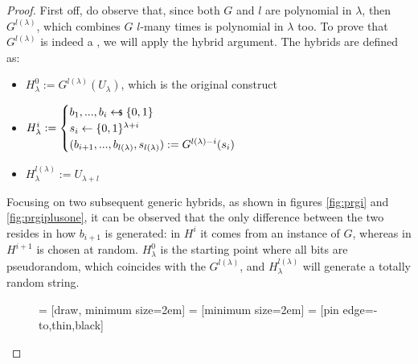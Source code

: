 \begin{proof}

    First off, do observe that, since both $G$ and $l$ are polynomial in $\lambda$, then $G^{l(\lambda)}$, which combines $G$ $l$-many times is polynomial in $\lambda$ too. To prove that $G^{l(\lambda)}$ is indeed a \prg, we will apply the hybrid argument. The hybrids are defined as:
    \begin{itemize}
        \item $H_{\lambda}^{0} := G^{l(\lambda)}(U_{\lambda})$, which is the original construct
        \item $H_{\lambda}^{i} :=
            \begin{cases}
                b_1 , ..., b_{i} \pickUAR \{0,1\} \\
                s_{i} \leftarrow \{0,1\}^{\lambda+i} \\
                (b_{i+1}, ..., b_{l(\lambda)}, s_{l(\lambda)}) := G^{l(\lambda)-i}(s_{i})
            \end{cases}$
        \item $H_{\lambda}^{l(\lambda)} := U_{\lambda + l}$
    \end{itemize}

    Focusing on two subsequent generic hybrids, as shown in figures \ref{fig:prgi} and \ref{fig:prgiplusone}, it can be observed that the only difference between the two resides in how $b_{i+1}$ is generated: in $H^{i}$ it comes from an instance of $G$, whereas in $H^{i+1}$ is chosen at random. $H_{\lambda}^{0}$ is the starting point where all bits are pseudorandom, which coincides with the $G^{l(\lambda)}$, and $H_{\lambda}^{l(\lambda)}$ will generate a totally random string.

    \begin{figure}[h]

           = [draw, minimum size=2em]
         = [minimum size=2em]
          = [pin edge={-to,thin,black}]

\end{figure}
\end{proof}
